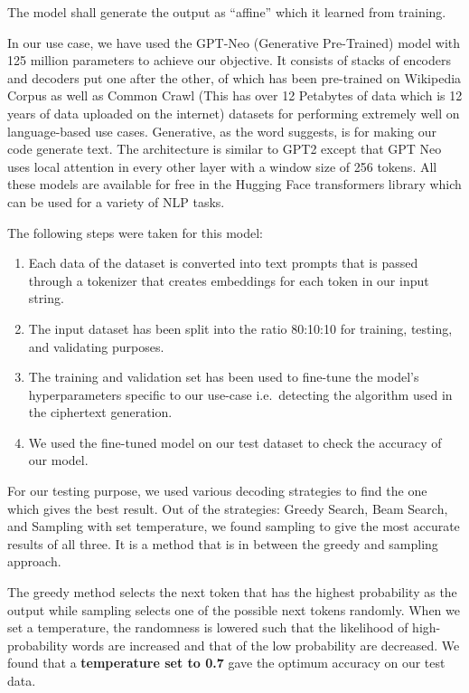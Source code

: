 \documentclass[a4paper]{article}
\begin{document}
The model shall generate the output as “affine” which it learned 
from training. 

In our use case, we have used the GPT-Neo (Generative Pre-Trained) model with 125 million parameters to achieve our objective.  It consists of stacks of encoders and decoders put one after the other, of which has been pre-trained on Wikipedia Corpus as well as Common Crawl (This has over 12 Petabytes of data which is 12 years of data uploaded on the internet) datasets for performing extremely well on language-based use cases. Generative, as the word suggests, is for making our code generate text. The architecture is similar to GPT2 except that GPT Neo uses local attention in every other layer with a window size of 256 tokens. All these models are available for free in the Hugging Face transformers library which can be used for a variety of NLP tasks.

\newpage

The following steps were taken for this model:
\begin{enumerate}
    \item   Each data of the dataset is converted into text prompts 
            that is passed through a tokenizer that creates embeddings 
            for each token in our input string. 
    \item   The input dataset has been split into the ratio 
            80:10:10 for training, testing, and validating purposes.
    \item   The training and validation set has been used to 
            fine-tune the model’s hyperparameters specific to 
            our use-case i.e.\ detecting the algorithm used in 
            the ciphertext generation.
    \item   We used the fine-tuned model on our test dataset 
            to check the accuracy of our model. 
\end{enumerate}

For our testing purpose, we used various decoding strategies 
to find the one which gives the best result. Out of the strategies: 
Greedy Search, Beam Search, and Sampling with set temperature, 
we found sampling to give the most accurate results of all three. 
It is a method that is in between the greedy and sampling approach.

The greedy method selects the next token that has the highest 
probability as the output while sampling selects one of the 
possible next tokens randomly. When we set a temperature, the 
randomness is lowered such that the likelihood of high-probability 
words are increased and that of the low probability are decreased. 
We found that a \textbf{temperature set to 0.7} gave the optimum accuracy 
on our test data. 
\end{document}
